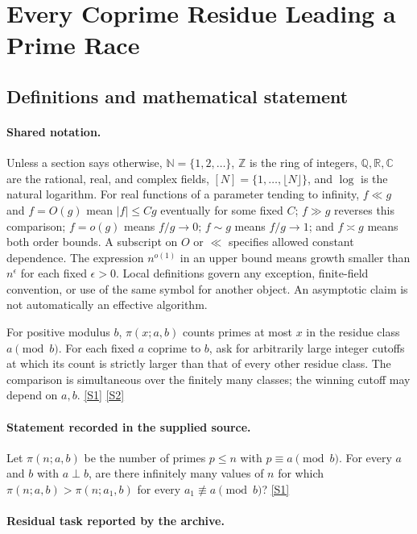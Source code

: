 \documentclass[11pt,a4paper]{article}
\newcommand{\N}{\mathbb{N}}
\newcommand{\Z}{\mathbb{Z}}
\newcommand{\Q}{\mathbb{Q}}
\newcommand{\R}{\mathbb{R}}
\newcommand{\C}{\mathbb{C}}
\newcommand{\sref}[2]{\hyperlink{source:#1:#2}{[S#2]}}
\begin{document}
\section{Every Coprime Residue Leading a Prime Race}\label{statement}


\subsection{Definitions and mathematical statement}

\paragraph{Shared notation.}Unless a section says otherwise, $\N=\{1,2,\ldots\}$,
$\Z$ is the ring of integers, $\Q,\R,\C$ are the rational, real, and complex
fields, $[N]=\{1,\ldots,\lfloor N\rfloor\}$, and $\log$ is the natural
logarithm. For real functions of a parameter tending to infinity,
$f\ll g$ and $f=O(g)$ mean $|f|\leq Cg$ eventually for some fixed $C$;
$f\gg g$ reverses this comparison; $f=o(g)$ means $f/g\to0$;
$f\sim g$ means $f/g\to1$; and $f\asymp g$ means both order bounds.
A subscript on $O$ or $\ll$ specifies allowed constant dependence.
The expression $n^{o(1)}$ in an upper bound means growth smaller than
$n^\epsilon$ for each fixed $\epsilon>0$. Local definitions govern any
exception, finite-field convention, or use of the same symbol for another
object. An asymptotic claim is not automatically an effective algorithm.



For positive modulus $b$, $\pi(x;a,b)$ counts primes at most $x$ in the residue class $a\pmod b$. For each fixed $a$ coprime to $b$, ask for arbitrarily large integer cutoffs at which its count is strictly larger than that of every other residue class. The comparison is simultaneous over the finitely many classes; the winning cutoff may depend on $a,b$. \sref{statement}{1} \sref{statement}{2}

\paragraph{Statement recorded in the supplied source.}
Let $\pi(n; a, b)$ be the number of primes $p \le n$ with $p \equiv a \pmod b$. For every $a$ and $b$ with $a \perp b$, are there infinitely many values of $n$ for which $\pi(n; a, b) > \pi(n; a_1, b)$ for every $a_1 \not\equiv a \pmod b$? \sref{statement}{1}

\paragraph{Residual task reported by the archive.}
\end{document}
